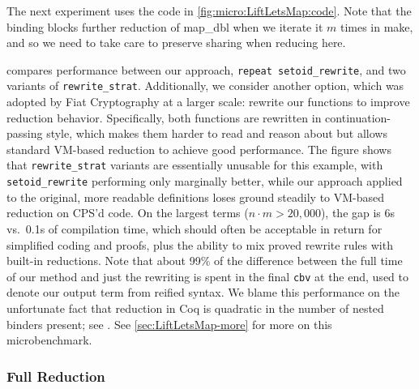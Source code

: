 The next experiment uses the code in \autoref{fig:micro:LiftLetsMap:code}.
Note that the  binding blocks further reduction of map\_dbl when we iterate it $m$ times in make, and so we need to take care to preserve sharing when reducing here.

 compares performance between our approach, \texttt{repeat setoid\_rewrite}, and two variants of \texttt{rewrite\_strat}.
Additionally, we consider another option, which was adopted by Fiat Cryptography at a larger scale: rewrite our functions to improve reduction behavior.
Specifically, both functions are rewritten in continuation-passing style, which makes them harder to read and reason about but allows standard VM-based reduction to achieve good performance.
The figure shows that \texttt{rewrite\_strat} variants are essentially unusable for this example, with \texttt{setoid\_rewrite} performing only marginally better, while our approach applied to the original, more readable definitions loses ground steadily to VM-based reduction on CPS'd code.
On the largest terms ($n \cdot m > 20,000$), the gap is 6s vs.\ 0.1s of compilation time, which should often be acceptable in return for simplified coding and proofs, plus the ability to mix proved rewrite rules with built-in reductions.
Note that about 99\% of the difference between the full time of our method and just the rewriting is spent in the final \texttt{cbv} at the end, used to denote our output term from reified syntax.
We blame this performance on the unfortunate fact that reduction in Coq is quadratic in the number of nested binders present; see .
See \autoref{sec:LiftLetsMap-more} for more on this microbenchmark.

\bgroup
{}
\subsubsection{Full Reduction}\label{sec:micro:Eratosthenes}

